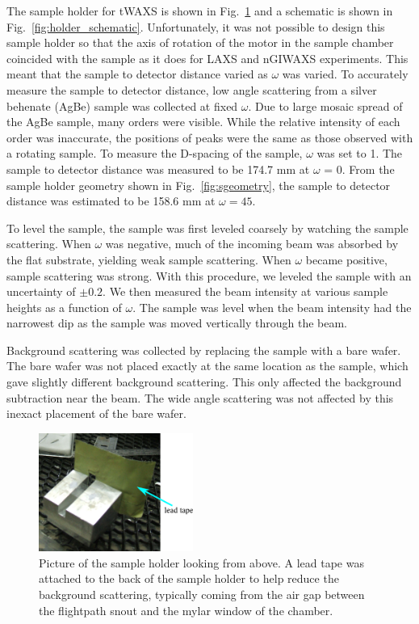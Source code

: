 The sample holder for tWAXS is shown in Fig.~\ref{fig:holder_picture} and a 
schematic is shown in Fig.~\ref{fig:holder_schematic}.  Unfortunately, it was not 
possible to design this sample holder so that the axis of rotation of the 
motor in the sample chamber coincided with the sample as it does for LAXS and 
nGIWAXS experiments.  This meant that the sample to detector distance varied 
as $\omega$ was varied. To accurately
measure the sample to detector distance, low angle scattering from a 
silver behenate (AgBe) sample was collected
at fixed $\omega$. Due to large mosaic spread of the AgBe sample, many orders were
visible. While the relative intensity of each order was inaccurate, 
the positions of peaks were the same as those observed with a rotating sample.
To measure the D-spacing of the sample, $\omega$ was set to 1\textdegree.
The sample to detector distance was measured to be 174.7 mm 
at $\omega$ = 0\textdegree.
From the sample holder geometry shown in Fig.~\ref{fig:sgeometry},
the sample to detector distance was estimated to be 
158.6 mm at $\omega=45$\textdegree.

To level the sample, 
the sample was first leveled coarsely by watching the sample scattering. When
$\omega$ was negative, much of the incoming beam was absorbed by the 
flat substrate, yielding weak sample scattering. When $\omega$ became 
positive, sample scattering was strong. With this procedure, 
we leveled the sample with an uncertainty of $\pm 0.2$\textdegree. We
then measured the beam intensity at various sample heights 
as a function of $\omega$. 
The sample was 
level when the beam intensity had the narrowest dip as the sample
was moved vertically through the beam.

Background scattering was collected by replacing the sample with a bare 
wafer. The bare wafer was not placed exactly at the same location
as the sample, which gave slightly different background scattering.
This only affected the background subtraction near the beam. 
The wide angle scattering was not affected by
this inexact placement of the bare wafer. 
\newpage
\begin{figure}[htbp]
  \centering
  \includegraphics[width=0.45\textwidth]{figures/ripple/MMs/transmission/sample_holder1}
  \caption{Picture of the sample holder looking from above. A lead tape was
  attached to the back of the sample holder to help reduce the background 
  scattering, typically coming from the air gap between the flightpath snout
  and the mylar window of the chamber.}
  \label{fig:holder_picture}
\end{figure}


